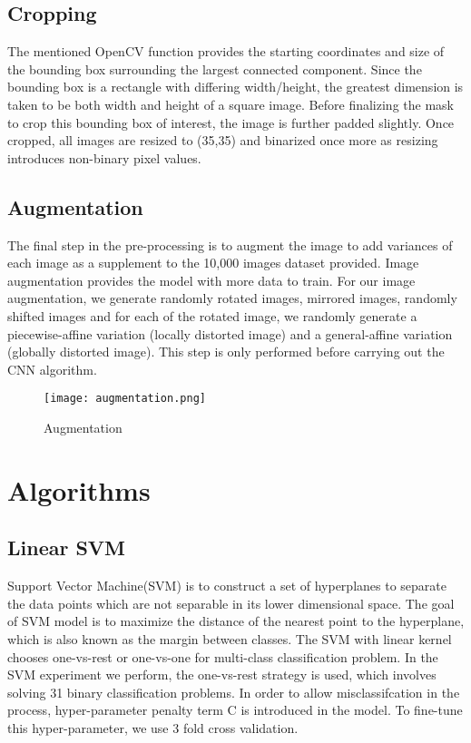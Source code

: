 \documentclass[conference]{IEEEtran}
\begin{document}
\subsection{Cropping}
The mentioned OpenCV function provides the starting coordinates and size of the bounding box surrounding the largest connected component. Since the bounding box is a rectangle with differing width/height, the greatest dimension is taken to be both width and height of a square image. Before finalizing the mask to crop this bounding box of interest, the image is further padded slightly. Once cropped, all images are resized to (35,35) and binarized once more as resizing introduces non-binary pixel values. 

\subsection{Augmentation}
The final step in the pre-processing is to augment the image to add variances of each image as a supplement to the 10,000 images dataset provided. Image augmentation provides the model with more data to train. For our image augmentation, we generate randomly rotated images, mirrored images, randomly shifted images and for each of the rotated image, we randomly generate a piecewise-affine variation (locally distorted image) and a general-affine variation (globally distorted image). This step is only performed before carrying out the CNN algorithm.

\begin{figure}[!htbp]
\centering
\texttt{[image: augmentation.png]}
\caption{Augmentation}
\end{figure}

\section{Algorithms}
\subsection{Linear SVM}
Support Vector Machine(SVM) is to construct a set of hyperplanes to separate the data points which are not separable in its lower dimensional space. \cite{Hearst:1998:SVM:630302.630387} The goal of SVM model is to maximize the distance of the nearest point to the hyperplane, which is also known as the margin between classes. The SVM with linear kernel chooses one-vs-rest or one-vs-one for multi-class classification problem. In the SVM experiment we perform, the one-vs-rest strategy is used, which involves solving 31 binary classification problems. \cite{Melgani2004ClassificationOH} In order to allow misclassifcation in the process, hyper-parameter penalty term C is introduced in the model. To fine-tune this hyper-parameter, we use 3 fold cross validation. 
\end{document}
